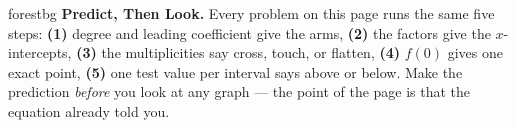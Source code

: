\documentclass[10pt]{article}
\begin{document}
\namepartnerperiod

\vspace{0.08in}

\begin{headlinebox}{forestbg}
\small\textbf{Predict, Then Look.} Every problem on this page runs the same five steps: \textbf{(1)}
degree and leading coefficient give the arms, \textbf{(2)} the factors give the $x$-intercepts,
\textbf{(3)} the multiplicities say cross, touch, or flatten, \textbf{(4)} $f(0)$ gives one exact
point, \textbf{(5)} one test value per interval says above or below. Make the prediction
\emph{before} you look at any graph --- the point of the page is that the equation already told you.
\end{headlinebox}

\vspace{0.06in}
\end{document}

